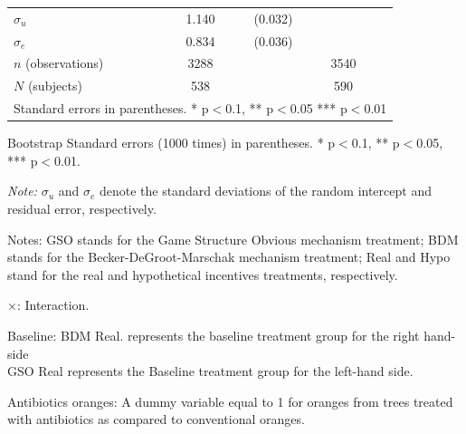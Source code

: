 \documentclass[12pt]{article}
\newcommand{\sym}[1]{\rlap{$^{#1}$}}
\begin{document}
\begin{table}[H]
{\begin{tabular}{l*{2}{cc}}
\hline
$\sigma_u $    &       1.140\sym{***}&     (0.032)&                     &            \\
$\sigma_e $     &       0.834\sym{***}&     (0.036)&                     &            \\
\hline
\(n\) (observations)    &        3288         &            &        3540         &            \\
\(N\) (subjects)      &        538         &            &        590         &            \\
\hline \hline
\multicolumn{5}{l}{\footnotesize Standard errors in parentheses. * p$<$0.1, ** p$<$0.05 *** p$<$0.01}\\
\end{tabular}
}

\begin{tablenotes}
            \footnotesize
           \item Bootstrap Standard errors (1000 times) in parentheses. * p$<$0.1, ** p$<$0.05, *** p$<$0.01.
            \item \textit{Note:} $\sigma_u$ and $\sigma_e$ denote the standard deviations of the random intercept and residual error, respectively.
            \item Notes: GSO stands for the Game Structure Obvious mechanism treatment; BDM stands for the Becker-DeGroot-Marschak mechanism treatment; Real and Hypo stand for the real and hypothetical incentives treatments, respectively.
           \item $\times$: Interaction.
           \item Baseline: BDM Real. represents the baseline treatment group for the right hand-side \\
           GSO Real represents the Baseline treatment group for the left-hand side.
           \item Antibiotics oranges: A dummy variable equal to 1 for oranges from trees treated with antibiotics as compared to conventional oranges.
        \end{tablenotes}
\end{table}
\end{document}
